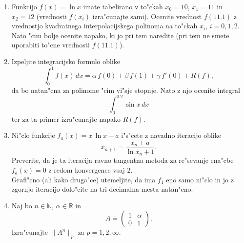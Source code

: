 \documentclass[12pt,a4paper]{article}
\def\RR{\mathbb{R}}
\def\NN{\mathbb{N}}
\begin{document}
\begin{enumerate}

  \item Funkcijo $f(x)=\ln{x}$ imate tabelirano v 
    to"ckah $x_0=10$, $x_1=11$ in $x_2=12$ (vrednosti 
    $f(x_i)$ izra"cunajte sami). Ocenite vrednost $f(11.1)$
    z vrednostjo kvadratnega interpolacijskega polinoma 
    na to"ckah $x_i$, $i=0,1,2$. Nato "cim bolje ocenite napako, ki jo
    pri tem naredite (pri tem ne smete uporabiti to"cne
    vrednosti $f(11.1)$).
    
  \item Izpeljite integracijsko formulo oblike
    $$\int_{0}^1 f(x)\,dx=\alpha\,f(0)+\beta\,f(1)+\gamma\,f'(0)+R(f),$$
    da bo natan"cna za polinome "cim vi"sje stopnje. Nato 
    z njo ocenite integral
    $$\int_{0}^{0.2}\sin{x}\,dx$$
    ter za ta primer izra"cunajte napako $R(f)$.
   
  \item Ni"clo funkcije $f_a(x)=x\,\ln{x}-a$ i"s"cete z navadno iteracijo
   oblike
   $$x_{n+1}=\frac{x_{n}+a}{\ln{x_n}+1}.$$
   Preverite, da je ta iteracija ravno tangentna metoda  za re"sevanje
   ena"cbe $f_a(x)=0$ z redom konvergence vsaj $2$.\\
   Grafi"cno (ali kako druga"ce) utemeljite, da ima $f_1$ eno samo
   ni"clo in jo z zgornjo iteracijo dolo"cite na tri decimalna mesta 
   natan"cno.
  
  \item Naj bo $n\in\NN$, $\alpha\in\RR$ in 
    $$A=\left(
      \begin{array}{cc}
        1 & \alpha \\
        0 & 1
      \end{array}\right).
    $$
    Izra"cunajte $\|A^n\|_p$ za $p=1,2,\infty$.


\end{enumerate}
\end{document}
